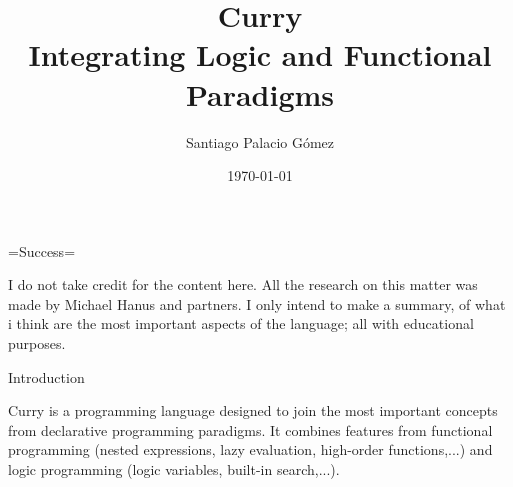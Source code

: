 \documentclass{beamer}
\title{Curry\\ Integrating Logic and Functional Paradigms}
\author{Santiago Palacio Gómez}
\institute{Universidad EAFIT\\Seminario de L\'ogica y Computaci\'on}
\date{\today}
\begin{document}
=Success=
\begin{frame}
  \titlepage
\end{frame}



\begin{frame}
  I do not take credit for the content here. All the research on this matter was made by Michael Hanus and partners. I only intend to make a summary, of what i think are the most important aspects of the language; all with educational purposes.
\end{frame}
\begin{frame}[allowframebreaks]
  \tableofcontents
\end{frame}


\begin{section}{Introduction}
  
  \begin{frame}
    Curry is a programming language designed to join the most important
    concepts from declarative programming paradigms. It combines features from functional programming (nested expressions, lazy evaluation, high-order functions,...) and logic programming (logic variables, built-in search,...).
  \end{frame}
\end{section}
\end{document}
